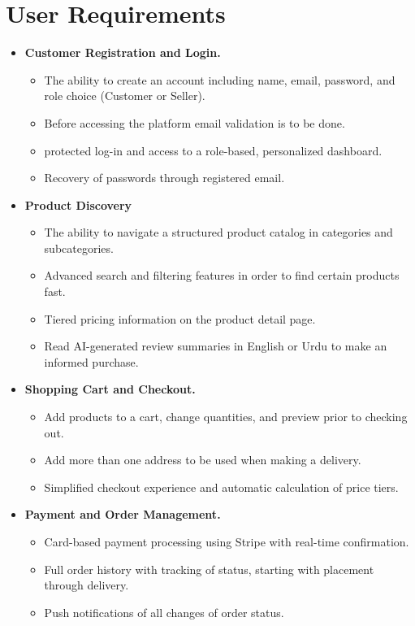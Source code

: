 \section{User Requirements}
\begin{itemize}
    \item \textbf{Customer Registration and Login.}
    \begin{itemize}
        \item The ability to create an account including name, email, password, and role choice (Customer or Seller).
        \item Before accessing the platform email validation is to be done.
        \item protected log-in and access to a role-based, personalized dashboard.
        \item Recovery of passwords through registered email.
    \end{itemize}

    \item \textbf{Product Discovery}
    \begin{itemize}
        \item The ability to navigate a structured product catalog in categories and subcategories.
        \item Advanced search and filtering features in order to find certain products fast.
        \item Tiered pricing information on the product detail page.
        \item Read AI-generated review summaries in English or Urdu to make an informed purchase.
    \end{itemize}

    \item \textbf{Shopping Cart and Checkout.}
    \begin{itemize}
        \item Add products to a cart, change quantities, and preview prior to checking out.
        \item Add more than one address to be used when making a delivery.
        \item Simplified checkout experience and automatic calculation of price tiers.
    \end{itemize}

    \item \textbf{Payment and Order Management.}
    \begin{itemize}
        \item Card-based payment processing using Stripe with real-time confirmation.
        \item Full order history with tracking of status, starting with placement through delivery.
        \item Push notifications of all changes of order status.
    \end{itemize}


\end{itemize}
